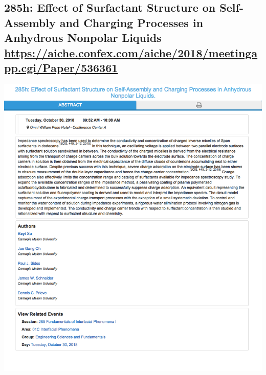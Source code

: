 \documentclass[11pt]{article}
\begin{document}
\subsection{285h: Effect of Surfactant Structure on Self-Assembly and Charging Processes in Anhydrous Nonpolar Liquids \url{https://aiche.confex.com/aiche/2018/meetingapp.cgi/Paper/536361}}
\label{sec:org43d4bb4}
\begin{center}
\includegraphics[width=.9\linewidth]{./536361.png}
\end{center}
\end{document}
